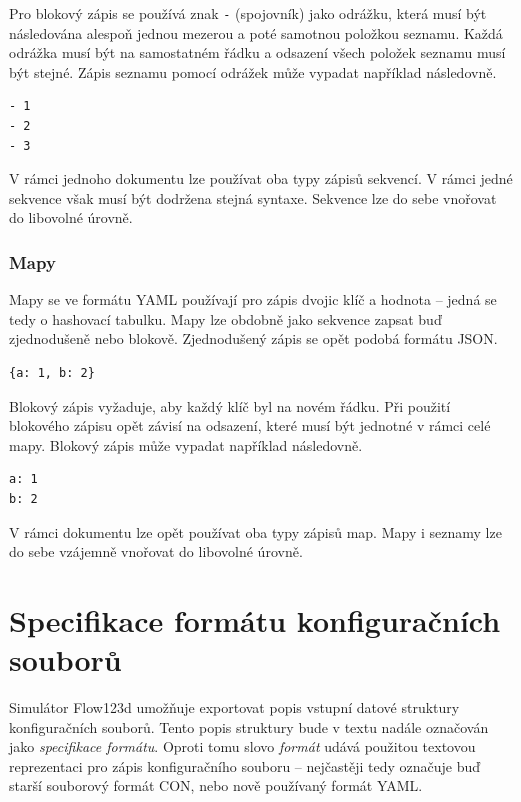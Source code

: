 \documentclass[FM,bw,DP]{tulthesis}
\begin{document}
Pro blokový zápis se používá znak \texttt{-} (spojovník) jako odrážku, která musí být následována alespoň jednou mezerou a poté samotnou položkou seznamu. Každá odrážka musí být na samostatném řádku a odsazení všech položek seznamu musí být stejné. Zápis seznamu pomocí odrážek může vypadat například následovně.

\vspace{5pt}
\begin{lstlisting}
- 1
- 2
- 3
\end{lstlisting}
\vspace*{-20pt}

V rámci jednoho dokumentu lze používat oba typy zápisů sekvencí. V rámci jedné sekvence však musí být dodržena stejná syntaxe. Sekvence lze do sebe vnořovat do libovolné úrovně.

\subsubsection*{Mapy}

Mapy se ve formátu YAML používají pro zápis dvojic klíč a hodnota -- jedná se tedy o hashovací tabulku. Mapy lze obdobně jako sekvence zapsat buď zjednodušeně nebo blokově. Zjednodušený zápis se opět podobá formátu JSON.

\vspace{5pt}
\begin{lstlisting}
{a: 1, b: 2}
\end{lstlisting}
\vspace*{-20pt}

Blokový zápis vyžaduje, aby každý klíč byl na novém řádku. Při použití blokového zápisu opět závisí na odsazení, které musí být jednotné v rámci celé mapy. Blokový zápis může vypadat například následovně.

\vspace{5pt}
\begin{lstlisting}
a: 1
b: 2
\end{lstlisting}
\vspace*{-20pt}

V rámci dokumentu lze opět používat oba typy zápisů map. Mapy i seznamy lze do sebe vzájemně vnořovat do libovolné úrovně.

\section{Specifikace formátu konfiguračních souborů}

Simulátor Flow123d umožňuje exportovat popis vstupní datové struktury konfiguračních souborů. Tento popis struktury bude v textu nadále označován jako \textit{specifikace formátu}. Oproti tomu slovo \textit{formát} udává použitou textovou reprezentaci pro zápis konfiguračního souboru -- nejčastěji tedy označuje buď starší souborový formát CON, nebo nově používaný formát YAML.
\end{document}
